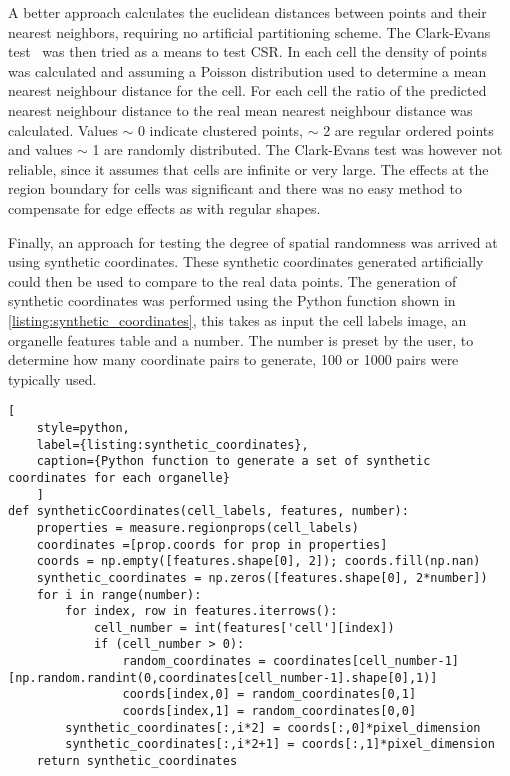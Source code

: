 A better approach calculates the euclidean distances between points and their nearest neighbors, requiring no artificial partitioning scheme. The Clark-Evans test~\cite{Clark1954} was then tried as a means to test CSR. In each cell the density of points was calculated and assuming a Poisson distribution used to determine a mean nearest neighbour distance for the cell. For each cell the ratio of the predicted nearest neighbour distance to the real mean nearest neighbour distance was calculated. Values $\sim$ 0 indicate clustered points, $\sim$ 2 are regular ordered points and values $\sim$ 1 are randomly distributed. The Clark-Evans test was however not reliable, since it assumes that cells are infinite or very large. The effects at the region boundary for cells was significant and there was no easy method to compensate for edge effects as with regular shapes.

Finally, an approach for testing the degree of spatial randomness was arrived at using synthetic coordinates. These synthetic coordinates generated artificially could then be used to compare to the real data points. The generation of synthetic coordinates was performed using the Python function shown in \autoref{listing:synthetic_coordinates}, this takes as input the cell labels image, an organelle features table and a number. The number is preset by the user, to determine how many coordinate pairs to generate, 100 or 1000 pairs were typically used.

\begin{lstlisting}[
	style=python,
	label={listing:synthetic_coordinates},
	caption={Python function to generate a set of synthetic coordinates for each organelle}
	]
def syntheticCoordinates(cell_labels, features, number):
    properties = measure.regionprops(cell_labels)
    coordinates =[prop.coords for prop in properties] 
    coords = np.empty([features.shape[0], 2]); coords.fill(np.nan)
    synthetic_coordinates = np.zeros([features.shape[0], 2*number])
    for i in range(number):
        for index, row in features.iterrows():
            cell_number = int(features['cell'][index])
            if (cell_number > 0):
                random_coordinates = coordinates[cell_number-1][np.random.randint(0,coordinates[cell_number-1].shape[0],1)]
                coords[index,0] = random_coordinates[0,1]
                coords[index,1] = random_coordinates[0,0]
        synthetic_coordinates[:,i*2] = coords[:,0]*pixel_dimension
        synthetic_coordinates[:,i*2+1] = coords[:,1]*pixel_dimension
    return synthetic_coordinates
\end{lstlisting}

